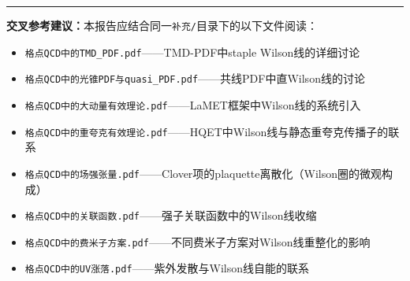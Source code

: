 \documentclass[12pt,a4paper]{ctexart}
\theoremstyle{definition}
\begin{document}
\vspace{0.5cm}
\noindent\rule{\textwidth}{0.5pt}
\small
\textbf{交叉参考建议：}本报告应结合同一\texttt{补充/}目录下的以下文件阅读：
\begin{itemize}[nosep]
    \item \texttt{格点QCD中的TMD\_PDF.pdf}——TMD-PDF中staple Wilson线的详细讨论
    \item \texttt{格点QCD中的光锥PDF与quasi\_PDF.pdf}——共线PDF中直Wilson线的讨论
    \item \texttt{格点QCD中的大动量有效理论.pdf}——LaMET框架中Wilson线的系统引入
    \item \texttt{格点QCD中的重夸克有效理论.pdf}——HQET中Wilson线与静态重夸克传播子的联系
    \item \texttt{格点QCD中的场强张量.pdf}——Clover项的plaquette离散化（Wilson圈的微观构成）
    \item \texttt{格点QCD中的关联函数.pdf}——强子关联函数中的Wilson线收缩
    \item \texttt{格点QCD中的费米子方案.pdf}——不同费米子方案对Wilson线重整化的影响
    \item \texttt{格点QCD中的UV涨落.pdf}——紫外发散与Wilson线自能的联系
\end{itemize}
\end{document}
